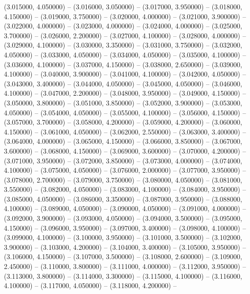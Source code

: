 (3.015000, 4.050000) -- 
(3.016000, 3.050000) -- 
(3.017000, 3.950000) -- 
(3.018000, 4.150000) -- 
(3.019000, 3.750000) -- 
(3.020000, 4.000000) -- 
(3.021000, 3.900000) -- 
(3.022000, 4.000000) -- 
(3.023000, 4.000000) -- 
(3.024000, 4.000000) -- 
(3.025000, 3.700000) -- 
(3.026000, 2.200000) -- 
(3.027000, 4.100000) -- 
(3.028000, 4.000000) -- 
(3.029000, 4.100000) -- 
(3.030000, 3.350000) -- 
(3.031000, 3.750000) -- 
(3.032000, 4.050000) -- 
(3.033000, 4.050000) -- 
(3.034000, 4.050000) -- 
(3.035000, 4.100000) -- 
(3.036000, 4.100000) -- 
(3.037000, 4.150000) -- 
(3.038000, 2.650000) -- 
(3.039000, 4.100000) -- 
(3.040000, 3.900000) -- 
(3.041000, 4.100000) -- 
(3.042000, 4.050000) -- 
(3.043000, 3.400000) -- 
(3.044000, 4.050000) -- 
(3.045000, 4.050000) -- 
(3.046000, 4.100000) -- 
(3.047000, 2.200000) -- 
(3.048000, 3.950000) -- 
(3.049000, 4.150000) -- 
(3.050000, 3.800000) -- 
(3.051000, 3.850000) -- 
(3.052000, 3.900000) -- 
(3.053000, 4.050000) -- 
(3.054000, 4.050000) -- 
(3.055000, 4.100000) -- 
(3.056000, 4.150000) -- 
(3.057000, 3.700000) -- 
(3.058000, 4.200000) -- 
(3.059000, 4.200000) -- 
(3.060000, 4.150000) -- 
(3.061000, 4.050000) -- 
(3.062000, 2.550000) -- 
(3.063000, 3.400000) -- 
(3.064000, 4.000000) -- 
(3.065000, 4.150000) -- 
(3.066000, 3.850000) -- 
(3.067000, 3.600000) -- 
(3.068000, 4.150000) -- 
(3.069000, 3.600000) -- 
(3.070000, 4.200000) -- 
(3.071000, 3.950000) -- 
(3.072000, 3.850000) -- 
(3.073000, 4.000000) -- 
(3.074000, 4.100000) -- 
(3.075000, 4.050000) -- 
(3.076000, 2.000000) -- 
(3.077000, 3.950000) -- 
(3.078000, 2.700000) -- 
(3.079000, 3.750000) -- 
(3.080000, 4.050000) -- 
(3.081000, 3.550000) -- 
(3.082000, 4.050000) -- 
(3.083000, 4.100000) -- 
(3.084000, 3.950000) -- 
(3.085000, 4.050000) -- 
(3.086000, 3.350000) -- 
(3.087000, 3.950000) -- 
(3.088000, 4.100000) -- 
(3.089000, 4.050000) -- 
(3.090000, 4.050000) -- 
(3.091000, 4.000000) -- 
(3.092000, 3.900000) -- 
(3.093000, 4.050000) -- 
(3.094000, 3.500000) -- 
(3.095000, 4.150000) -- 
(3.096000, 3.950000) -- 
(3.097000, 3.400000) -- 
(3.098000, 4.100000) -- 
(3.099000, 4.100000) -- 
(3.100000, 3.950000) -- 
(3.101000, 3.500000) -- 
(3.102000, 3.900000) -- 
(3.103000, 4.200000) -- 
(3.104000, 3.400000) -- 
(3.105000, 3.950000) -- 
(3.106000, 4.150000) -- 
(3.107000, 3.500000) -- 
(3.108000, 2.600000) -- 
(3.109000, 2.450000) -- 
(3.110000, 3.800000) -- 
(3.111000, 4.000000) -- 
(3.112000, 3.950000) -- 
(3.113000, 3.800000) -- 
(3.114000, 3.300000) -- 
(3.115000, 4.100000) -- 
(3.116000, 4.100000) -- 
(3.117000, 4.050000) -- 
(3.118000, 4.200000) -- 
